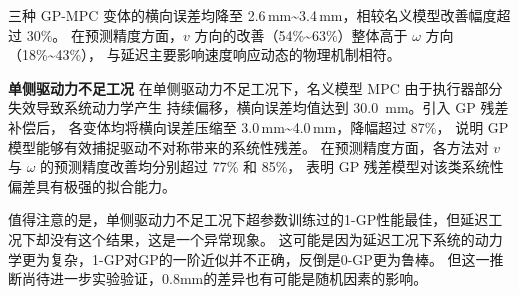 \begin{table}[htbp]
\centering
\caption{实车实验控制精度与预测精度汇总}
\label{tab:real_ctrl}
\end{table}
 
三种 GP-MPC 变体的横向误差均降至
2.6\,mm\textasciitilde3.4\,mm，相较名义模型改善幅度超过 30\%。
在预测精度方面，$v$ 方向的改善（54\%\textasciitilde63\%）整体高于
$\omega$ 方向（18\%\textasciitilde43\%），
与延迟主要影响速度响应动态的物理机制相符。
 
\textbf{单侧驱动力不足工况} \quad
在单侧驱动力不足工况下，名义模型 MPC 由于执行器部分失效导致系统动力学产生
持续偏移，横向误差均值达到 \SI{30.0}{mm}。引入 GP 残差补偿后，
各变体均将横向误差压缩至 3.0\,mm\textasciitilde4.0\,mm，降幅超过 87\%，
说明 GP 模型能够有效捕捉驱动不对称带来的系统性残差。
在预测精度方面，各方法对 $v$ 与 $\omega$ 的预测精度改善均分别超过 77\% 和 85\%，
表明 GP 残差模型对该类系统性偏差具有极强的拟合能力。

值得注意的是，单侧驱动力不足工况下超参数训练过的1-GP性能最佳，但延迟工况下却没有这个结果，这是一个异常现象。
这可能是因为延迟工况下系统的动力学更为复杂，1-GP对GP的一阶近似并不正确，反倒是0-GP更为鲁棒。
但这一推断尚待进一步实验验证，0.8mm的差异也有可能是随机因素的影响。
 
